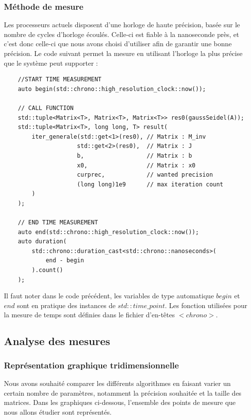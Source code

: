 \subsubsection{Méthode de mesure}
Les processeurs actuels disposent d'une horloge de haute précision, basée sur le nombre de cycles d'horloge écoulés. Celle-ci est fiable à la nanoseconde près, et c'est donc celle-ci que nous avons choisi d'utiliser afin de garantir une bonne précision. Le code suivant permet la mesure en utilisant l'horloge la plus précise que le système peut supporter :

\begin{verbatim}
	//START TIME MEASUREMENT
	auto begin(std::chrono::high_resolution_clock::now());
	
	// CALL FUNCTION
	std::tuple<Matrix<T>, Matrix<T>, Matrix<T>> res0(gaussSeidel(A));
	std::tuple<Matrix<T>, long long, T> result(
		iter_generale(std::get<1>(res0), // Matrix : M_inv
					 std::get<2>(res0),  // Matrix : J
					 b,                  // Matrix : b
					 x0,                 // Matrix : x0
					 curprec,            // wanted precision
					 (long long)1e9      // max iteration count
		)
	);
	
	// END TIME MEASUREMENT
	auto end(std::chrono::high_resolution_clock::now());
	auto duration(
		std::chrono::duration_cast<std::chrono::nanoseconds>(
			end - begin
		).count()
	);

\end{verbatim}

Il faut noter dans le code précédent, les variables de type automatique $begin$ et $end$ sont en pratique des instances de $std::time\_point$. Les fonction utilisées pour la mesure de temps sont définies dans le fichier d'en-têtes $<chrono>$.\\



\subsection{Analyse des mesures}

\subsubsection{Représentation graphique tridimensionnelle}
Nous avons souhaité comparer les différents algorithmes en faisant varier un certain nombre de paramètres, notamment la précision souhaitée et la taille des matrices. Dans les graphiques ci-dessous, l'ensemble des points de mesure que nous allons étudier sont représentés.


